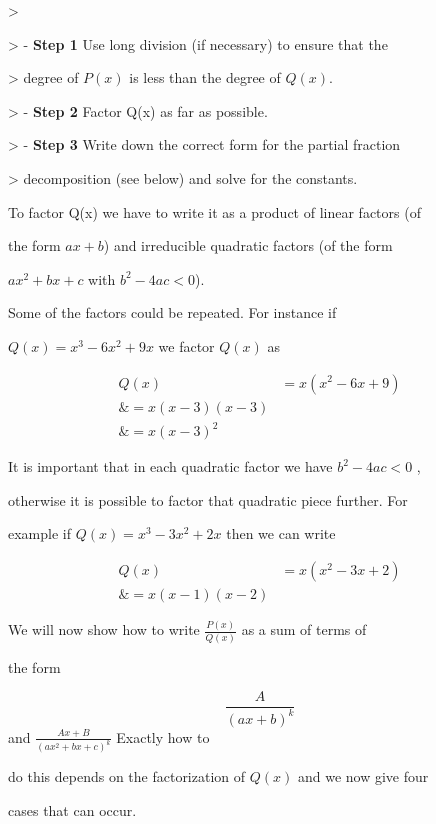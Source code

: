 >

> -   \textbf{Step 1} Use long division (if necessary) to ensure that the

>     degree of $P(x)$ is less than the degree of $Q(x)$.

> -   \textbf{Step 2} Factor Q(x) as far as possible.

> -   \textbf{Step 3} Write down the correct form for the partial fraction

>     decomposition (see below) and solve for the constants.



To factor Q(x) we have to write it as a product of linear factors (of

the form $ax+b$) and irreducible quadratic factors (of the form

$ax^2+bx+c$ with $b^2-4ac<0$).



Some of the factors could be repeated. For instance if

$Q(x) = x^3-6x^2+9x$ we factor $Q(x)$ as



\begin{align}
Q(x) &= x(x^2 - 6x + 9) \\\&= x(x - 3)(x - 3) \\\&= x(x - 3)^2
\end{align}



It is important that in each quadratic factor we have $b^2-4ac<0$ ,

otherwise it is possible to factor that quadratic piece further. For

example if $Q(x)=x^3-3x^2+2x$ then we can write



\begin{align}
Q(x) &= x(x^2 - 3x + 2) \\\&= x(x - 1)(x - 2)
\end{align}





We will now show how to write $\frac{P(x)}{Q(x)}$ as a sum of terms of

the form



$$\frac{A}{(ax+b)^k}$$ and $\frac{Ax+B}{(ax^2+bx+c)^k}$ Exactly how to

do this depends on the factorization of $Q(x)$ and we now give four

cases that can occur.



